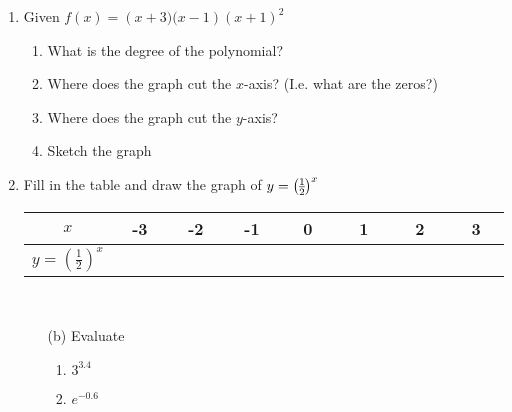 \begin{enumerate}
	
	\item  Given $f (x) =\left (x +3)(x -1\right )\left (x +1\right )^{2}$ 
	

	\begin{enumerate}
		\item What is the degree of the polynomial? 
		
		\item Where does
		the graph cut the $x$-axis? (I.e. what are the zeros?) 
		
		\item Where does the graph cut the $y$-axis? 
		
		\item Sketch the graph \\\relax
		\setlength\fboxrule{0in}\setlength\fboxsep{0.2in}
	\end{enumerate}

	\item Fill in the
	table and draw the graph of $y =\genfrac{(}{)}{}{}{1}{2}^{x}\vspace{+0.500000cm}$ \\\relax
	\begin{tabular}[c]{|c|c|c|c|c|c|c|c|}\hline
		$x$  & -3  & -2  & -1
		& 0  & 1  & 2  & 3
		\\
		\hline
		$y =\genfrac{(}{)}{}{}{1}{2}^{x}$  & \ \ \ \ \ \rule[-8pt]{0pt}{24pt}
		& \ \ \ \ \ \rule[-8pt]{0pt}{24pt}
		& \ \ \ \ \ \rule[-8pt]{0pt}{24pt}
		& \ \ \ \ \ \rule[-8pt]{0pt}{24pt}
		& \ \ \ \ \ \rule[-8pt]{0pt}{24pt}
		& \ \ \ \ \ \rule[-8pt]{0pt}{24pt}
		& \ \ \ \ \ \rule[-8pt]{0pt}{24pt}
		\\
		\hline
	\end{tabular} \\\relax
	\setlength\fboxrule{0in}\setlength\fboxsep{0.2in}
	
	
	
	\begin{enumerate}
		\item [(b)] Evaluate 
		
		
		\begin{enumerate}
			\item $3^{3.4}$ 
			
			\item $e^{ -0.6}$ \end{enumerate}
	\end{enumerate}
	

\end{enumerate}
